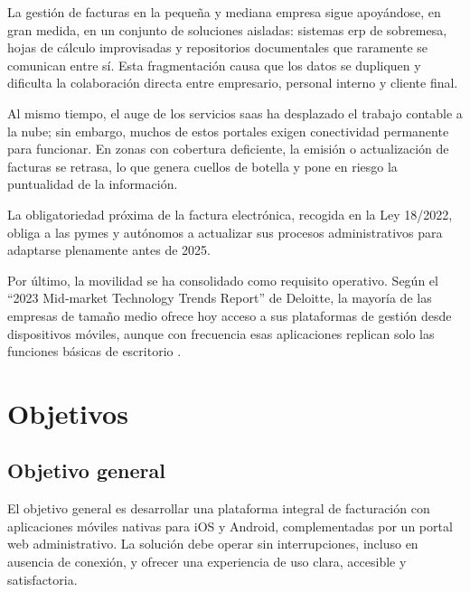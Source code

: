 \begin{large}
La gestión de facturas en la pequeña y mediana empresa sigue apoyándose, en gran medida, en un conjunto de soluciones aisladas: sistemas \gls{erp} de sobremesa, hojas de cálculo improvisadas y repositorios documentales que raramente se comunican entre sí. Esta fragmentación causa que los datos se dupliquen y dificulta la colaboración directa entre empresario, personal interno y cliente final.

Al mismo tiempo, el auge de los servicios \gls{saas} ha desplazado el trabajo contable a la nube; sin embargo, muchos de estos portales exigen conectividad permanente para funcionar. En zonas con cobertura deficiente, la emisión o actualización de facturas se retrasa, lo que genera cuellos de botella y pone en riesgo la puntualidad de la información.

La obligatoriedad próxima de la factura electrónica, recogida en la Ley 18/2022, obliga a las pymes y autónomos a actualizar sus procesos administrativos para adaptarse plenamente antes de 2025.

Por último, la movilidad se ha consolidado como requisito operativo. Según el \enquote{2023 Mid‐market Technology Trends Report} de Deloitte, la mayoría de las empresas de tamaño medio ofrece hoy acceso a sus plataformas de gestión desde dispositivos móviles, aunque con frecuencia esas aplicaciones replican solo las funciones básicas de escritorio \cite{estudio_movilidad}.
\end{large}

\section{Objetivos}

\subsection{Objetivo general}

\begin{large}
El objetivo general es desarrollar una plataforma integral de facturación con aplicaciones móviles nativas para iOS y Android, complementadas por un portal web administrativo. La solución debe operar sin interrupciones, incluso en ausencia de conexión, y ofrecer una experiencia de uso clara, accesible y satisfactoria.
\end{large}

